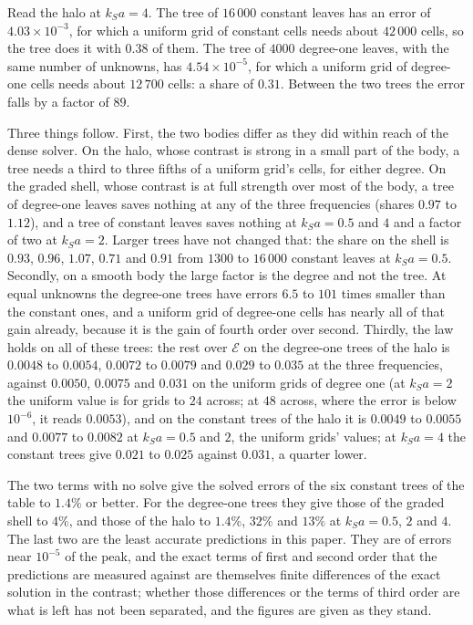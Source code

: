 \documentclass[11pt,a4paper]{article}
\newcommand{\cE}{\mathcal{E}}
\begin{document}
Read the halo at $k_Sa=4$. The tree of $16\,000$ constant leaves has an error of $4.03\times10^{-3}$,
for which a uniform grid of constant cells needs about $42\,000$ cells, so the tree does it with $0.38$
of them. The tree of $4000$ degree-one leaves, with the same number of unknowns, has
$4.54\times10^{-5}$, for which a uniform grid of degree-one cells needs about $12\,700$ cells: a share
of $0.31$. Between the two trees the error falls by a factor of $89$.

Three things follow. First, the two bodies differ as they did within reach of the dense solver. On the
halo, whose contrast is strong in a small part of the body, a tree needs a third to three fifths of a
uniform grid's cells, for either degree. On the graded shell, whose contrast is at full strength over
most of the body, a tree of degree-one leaves saves nothing at any of the three frequencies (shares
$0.97$ to $1.12$), and a tree of constant leaves saves nothing at $k_Sa=0.5$ and $4$ and a factor of two
at $k_Sa=2$. Larger trees have not changed that: the share on the shell is $0.93$, $0.96$, $1.07$,
$0.71$ and $0.91$ from $1300$ to $16\,000$ constant leaves at $k_Sa=0.5$. Secondly, on a smooth body the
large factor is the degree and not the tree. At equal unknowns the degree-one trees have errors $6.5$ to
$101$ times smaller than the constant ones, and a uniform grid of degree-one cells has nearly all of
that gain already, because it is the gain of fourth order over second. Thirdly, the law holds on all of
these trees: the rest over $\cE$ on the degree-one trees of the halo is $0.0048$ to $0.0054$,
$0.0072$ to $0.0079$ and $0.029$ to $0.035$ at the three frequencies, against $0.0050$, $0.0075$ and
$0.031$ on the uniform grids of degree one (at $k_Sa=2$ the uniform value is for grids to $24$ across;
at $48$ across, where the error is below $10^{-6}$, it reads $0.0053$), and on the constant trees of the halo it is $0.0049$ to
$0.0055$ and $0.0077$ to $0.0082$ at $k_Sa=0.5$ and $2$, the uniform grids' values; at $k_Sa=4$ the
constant trees give $0.021$ to $0.025$ against $0.031$, a quarter lower.

The two terms with no solve give the solved errors of the six constant trees of the table to $1.4\%$ or
better. For the degree-one trees they give those of the graded shell to $4\%$, and those of the halo to
$1.4\%$, $32\%$ and $13\%$ at $k_Sa=0.5$, $2$ and $4$. The last two are the least accurate predictions in
this paper. They are of errors near $10^{-5}$ of the peak, and the exact terms of first and second order
that the predictions are measured against are themselves finite differences of the exact solution in
the contrast; whether those differences or the terms of third order are what is left has not been
separated, and the figures are given as they stand.
\end{document}
